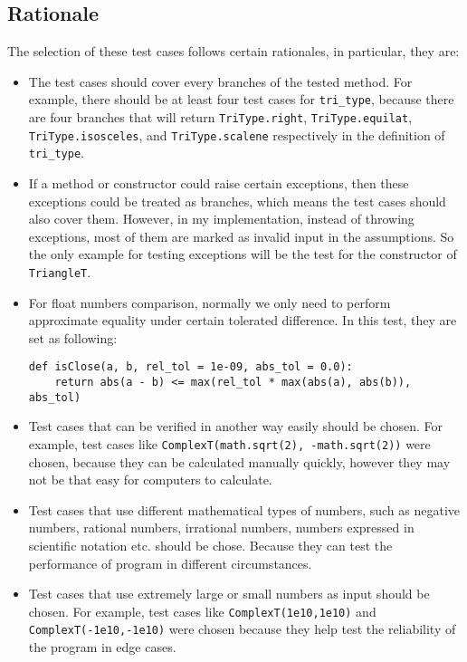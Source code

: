 \documentclass[12pt]{article}
\begin{document}
\subsection{Rationale}
The selection of these test cases follows certain rationales, in particular, they are:
\begin{itemize}
\item The test cases should cover every branches of the tested method. For example, there should be at least four test cases for \verb|tri_type|, because there are four branches that will return \verb|TriType.right|, \verb|TriType.equilat|, \verb|TriType.isosceles|, and \verb|TriType.scalene| respectively in the definition of \verb|tri_type|.
\item If a method or constructor could raise certain exceptions, then these exceptions could be treated as branches, which means the test cases should also cover them. However, in my implementation, instead of throwing exceptions, most of them are marked as invalid input in the assumptions. So the only example for testing exceptions will be the test for the constructor of \verb|TriangleT|.
\item For float numbers comparison, normally we only need to perform 
approximate equality under certain tolerated difference. In this test, they are set as following:
\lstset{language=Python, basicstyle=\ttfamily\small, breaklines=true, showspaces=false,
  showstringspaces=false, breakatwhitespace=true}
\begin{lstlisting}
def isClose(a, b, rel_tol = 1e-09, abs_tol = 0.0):
    return abs(a - b) <= max(rel_tol * max(abs(a), abs(b)), abs_tol)
\end{lstlisting}
\item Test cases that can be verified in another way easily should be chosen. For example, test cases like \verb|ComplexT(math.sqrt(2), -math.sqrt(2))| were chosen, because they can be calculated manually quickly, however they may not be that easy for computers to calculate.
\item Test cases that use different mathematical types of numbers, such as negative numbers, rational numbers, irrational numbers, numbers expressed in scientific notation etc. should be chose. Because they can test the performance of program in different circumstances.
\item Test cases that use extremely large or small numbers as input should be chosen. For example, test cases like \verb|ComplexT(1e10,1e10)| and \verb|ComplexT(-1e10,-1e10)| were chosen because they help test the reliability of the program in edge cases.
\end{itemize}
\end{document}
